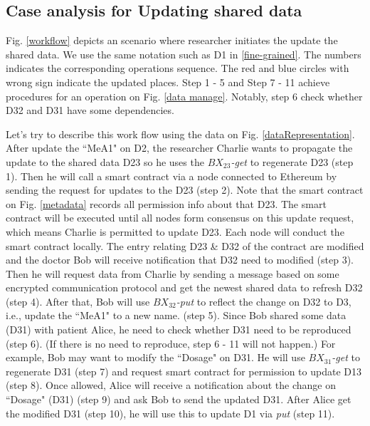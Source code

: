 \documentclass[conference]{IEEEtran}
\begin{document}
\subsection{Case analysis for Updating shared data}
\label{updateCase}

Fig. \ref{workflow} depicts an scenario where researcher initiates the update the shared data. We use the same notation such as D1 in \ref{fine-grained}. The numbers indicates the corresponding operations sequence. The red and blue circles with wrong sign indicate the updated places. Step 1 - 5 and Step 7 - 11 achieve procedures for an operation on Fig. \ref{data manage}. Notably, step 6 check whether D32 and D31 have some dependencies.  

Let's try to describe this work flow using the data on Fig. \ref{dataRepresentation}. After update the ``MeA1" on D2, the researcher Charlie wants to propagate the update to the shared data D23 so he uses the \emph{$BX_{23}$-get} to regenerate D23 (step 1). Then he will call a smart contract via a node connected to Ethereum by sending the request for updates to the D23 (step 2). Note that the smart contract on Fig. \ref{metadata}  records all permission info about that D23. 
The smart contract will be executed until all nodes form consensus on this update request, which means Charlie is permitted to update D23. Each node will conduct the smart contract locally. The entry relating D23 \& D32 of the contract are modified and the doctor Bob will receive notification that D32 need to modified (step 3). Then he will request data from Charlie by sending a message based on some encrypted communication protocol and get the newest shared data to refresh D32 (step 4). After that, Bob will use \emph{$BX_{32}$-put} to reflect the change on D32 to D3, i.e., update the ``MeA1" to a new name. (step 5). Since Bob shared some data (D31) with patient Alice, he need to check whether D31 need to be reproduced (step 6). (If there is no need to reproduce, step 6 - 11 will not happen.) For example, Bob may want to modify the ``Dosage" on D31. He will use \emph{$BX_{31}$-get} to regenerate D31 (step 7) and request smart contract for permission to update D13 (step 8). Once allowed, Alice will receive a notification about the change on ``Dosage" (D31) (step 9) and ask Bob to send the updated D31. After Alice get the modified D31 (step 10), he will use this to update D1 via \emph{put} (step 11).  
\end{document}
